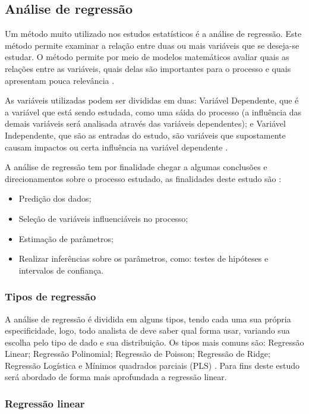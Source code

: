 \subsection{Análise de regressão}

Um método muito utilizado nos estudos estatísticos é a análise de regressão. Este método permite examinar a relação entre duas ou mais variáveis que se deseja-se estudar. O método permite por meio de modelos matemáticos avaliar quais as relações entre as variáveis, quais delas são importantes para o processo e quais apresentam pouca relevância \cite{4}. 

As variáveis utilizadas podem ser divididas em duas: Variável Dependente, que é a variável que está sendo estudada, como uma sáida do processo (a influência das demais variáveis será analisada através das variáveis dependentes); e Variável Independente, que são as entradas do estudo, são variáveis que supostamente causam impactos ou certa influência na variável dependente \cite{4}.

A análise de regressão tem por finalidade chegar a algumas conclusões e direcionamentos sobre o processo estudado, as finalidades deste estudo são \cite{4}:

\begin{itemize}
    \item Predição dos dados;
    \item Seleção de variáveis influenciáveis no processo;
    \item Estimação de parâmetros;
    \item Realizar inferências sobre os parâmetros, como: testes de hipóteses e intervalos de confiança.
\end{itemize}

\subsubsection{Tipos de regressão}

A análise de regressão é dividida em alguns tipos, tendo cada uma sua própria especificidade, logo, todo analista de deve saber qual forma usar, variando sua escolha pelo tipo de dado e sua distribuição. Os tipos mais comuns são: Regressão Linear; Regressão Polinomial; Regressão de Poisson; Regressão de Ridge; Regressão Logística e Mínimos quadrados parciais (PLS) \cite{5}. Para fins deste estudo será abordado de forma mais aprofundada a regressão linear. 

\subsubsection*{Regressão linear}

